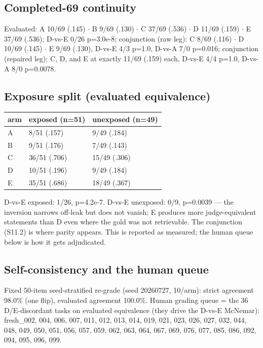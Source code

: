 \documentclass[10pt]{article}
\begin{document}
\subsection{Completed-69 continuity}\label{s11:completed}

Evaluated: A 10/69 (.145) $\cdot$ B 9/69 (.130) $\cdot$ C 37/69 (.536)
$\cdot$ D 11/69 (.159) $\cdot$ E 37/69 (.536); D-vs-E 0/26 p=3.0e-8;
conjunction (raw leg): C 8/69 (.116) $\cdot$ D 10/69 (.145) $\cdot$
E 9/69 (.130), D-vs-E 4/3 p=1.0, D-vs-A 7/0 p=0.016; conjunction
(repaired leg): C, D, and E at exactly 11/69 (.159) each, D-vs-E 4/4
p=1.0, D-vs-A 8/0 p=0.0078.

\subsection{Exposure split (evaluated equivalence)}\label{s11:exposure}

\begin{center}\footnotesize
\begin{tabular}{@{}lll@{}}
\toprule
arm & exposed (n=51) & unexposed (n=49) \\
\midrule
A & 8/51 (.157) & 9/49 (.184) \\
B & 9/51 (.176) & 7/49 (.143) \\
C & 36/51 (.706) & 15/49 (.306) \\
D & 10/51 (.196) & 9/49 (.184) \\
E & 35/51 (.686) & 18/49 (.367) \\
\bottomrule
\end{tabular}
\end{center}

D-vs-E exposed: 1/26, p=4.2e-7. D-vs-E unexposed: 0/9, p=0.0039 ---
the inversion narrows off-leak but does not vanish; E produces more
judge-equivalent statements than D even where the gold was not
retrievable. The conjunction (S11.2) is where parity appears. This is
reported as measured; the human queue below is how it gets
adjudicated.

\subsection{Self-consistency and the human queue}\label{s11:queue}

Fixed 50-item seed-stratified re-grade (seed 20260727, 10/arm): strict
agreement 98.0\% (one flip), evaluated agreement 100.0\%. Human
grading queue = the 36 D/E-discordant tasks on evaluated equivalence
(they drive the D-vs-E McNemar): fresh\_002, 004, 006, 007, 011, 012,
013, 014, 019, 021, 023, 026, 027, 032, 044, 048, 049, 050, 051, 056,
057, 059, 062, 063, 064, 067, 069, 076, 077, 085, 086, 092, 094, 095,
096, 099.
\end{document}
